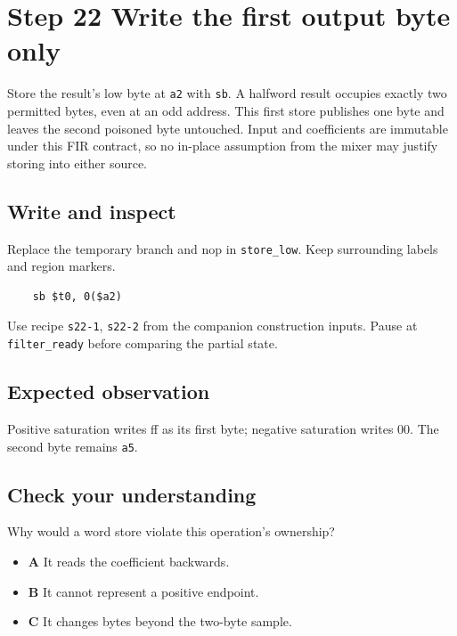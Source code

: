\section{Step 22 Write the first output byte only}\label{fir-s22}

Store the result’s low byte at \texttt{a2} with \texttt{sb}. A halfword result occupies exactly two permitted bytes, even at an odd address. This first store publishes one byte and leaves the second poisoned byte untouched. Input and coefficients are immutable under this FIR contract, so no in-place assumption from the mixer may justify storing into either source.

\subsection{Write and inspect}
Replace the temporary branch and nop in \texttt{store\_low}. Keep surrounding labels and region markers.

\begin{verbatim}
    sb $t0, 0($a2)
\end{verbatim}
Use recipe \texttt{s22-1}, \texttt{s22-2} from the companion construction inputs. Pause at \texttt{filter\_ready} before comparing the partial state.

\subsection{Expected observation}
Positive saturation writes ff as its first byte; negative saturation writes 00. The second byte remains \texttt{a5}.

\subsection{Check your understanding}
Why would a word store violate this operation’s ownership?

\begin{itemize}
  \item \textbf{A} It reads the coefficient backwards.
  \item \textbf{B} It cannot represent a positive endpoint.
  \item \textbf{C} It changes bytes beyond the two-byte sample.
\end{itemize}
